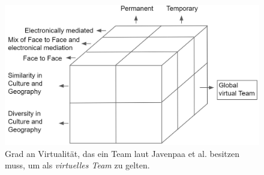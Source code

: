 \documentclass[a4paper,11pt]{article}%
\renewcommand{\\}{\vspace*{0.5\baselineskip} \newline}
\begin{document}
\begin{figure}[H]
		\begin{footnotesize}
		\centering
			\includegraphics[scale=0.4]{Abbildungen/Global-Virtual-Team.jpg}	
			\caption[Virtualität eines virtuellen Teams]{Grad an Virtualität, das ein Team laut Javenpaa et al. \citep{jarvenpaa1999communication} besitzen muss, um als \textit{virtuelles Team} zu gelten.}
			\label{virtualTeamsVirtuality}
		\end{footnotesize}
	\end{figure}
%
\end{document}
